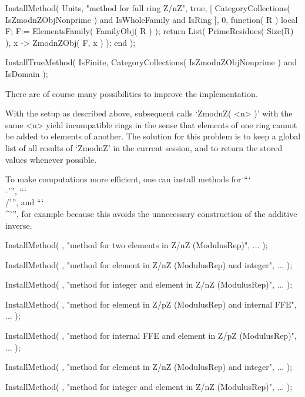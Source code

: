     InstallMethod( Units,
        "method for full ring Z/nZ",
        true,
        [     CategoryCollections( IsZmodnZObjNonprime )
          and IsWholeFamily and IsRing ],
        0,
        function( R )
        local F;
        F:= ElementsFamily( FamilyObj( R ) );
        return List( PrimeResidues( Size(R) ), x -> ZmodnZObj( F, x ) );
        end );

    InstallTrueMethod( IsFinite,
        CategoryCollections( IsZmodnZObjNonprime ) and IsDomain );
\endexample



There are of course many possibilities to improve the implementation.

With the setup as described above,
subsequent calls `ZmodnZ( <n> )' with the same <n> yield incompatible
rings in the sense that elements of one ring cannot be added to elements
of another.
The solution for this problem is to keep a global list of all results of
`ZmodnZ' in the current {\GAP} session, and to return the stored values
whenever possible.

To make computations more efficient,
one can install methods for ```\\-''', ```\\/''', and ```\\^''',
for example because this avoids the unnecessary construction of the
additive inverse.

\beginexample
    InstallMethod( \-,
        "method for two elements in Z/nZ (ModulusRep)",
        ... );

    InstallMethod( \-,
        "method for element in Z/nZ (ModulusRep) and integer",
        ... );

    InstallMethod( \-,
        "method for integer and element in Z/nZ (ModulusRep)",
        ... );

    InstallMethod( \-,
        "method for element in Z/pZ (ModulusRep) and internal FFE",
        ... );

    InstallMethod( \-,
        "method for internal FFE and element in Z/pZ (ModulusRep)",
        ... );

    InstallMethod( \*,
        "method for element in Z/nZ (ModulusRep) and integer",
        ... );

    InstallMethod( \*,
        "method for integer and element in Z/nZ (ModulusRep)",
        ... );

